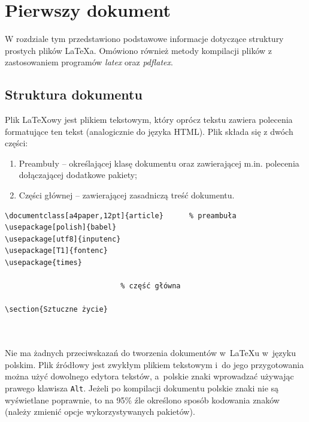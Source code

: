 \chapter{Pierwszy dokument}
\label{cha:pierwszyDokument}

W rozdziale tym przedstawiono podstawowe informacje dotyczące struktury prostych plików \LaTeX a. Omówiono również metody kompilacji plików z zastosowaniem programów \emph{latex} oraz \emph{pdflatex}.


\section{Struktura dokumentu}
\label{sec:strukturaDokumentu}

Plik \LaTeX owy jest plikiem tekstowym, który oprócz tekstu zawiera polecenia formatujące ten tekst (analogicznie do języka HTML). Plik składa się z dwóch części:
\begin{enumerate}%
      \item Preambuły -- określającej klasę dokumentu oraz zawierającej m.in. polecenia dołączającej dodatkowe pakiety;

      \item Części głównej -- zawierającej zasadniczą treść dokumentu.
\end{enumerate}

\begin{lstlisting}
\documentclass[a4paper,12pt]{article}      % preambuła
\usepackage[polish]{babel}
\usepackage[utf8]{inputenc}
\usepackage[T1]{fontenc}
\usepackage{times}

                           % część główna

\section{Sztuczne życie}



\end{lstlisting}

Nie ma żadnych przeciwskazań do tworzenia dokumentów w~\LaTeX u w~języku polskim. Plik źródłowy jest zwykłym plikiem tekstowym i~do jego przygotowania można użyć dowolnego edytora tekstów, a~polskie znaki wprowadzać używając prawego klawisza \texttt{Alt}. Jeżeli po kompilacji dokumentu polskie znaki nie są wyświetlane poprawnie, to na 95\% źle określono sposób kodowania znaków (należy zmienić opcje wykorzystywanych pakietów).


